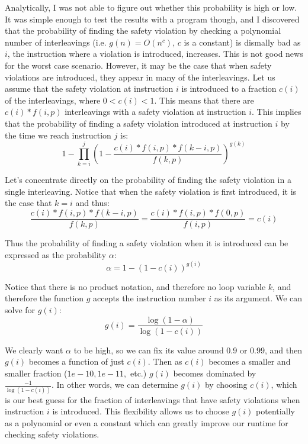 \documentclass[12pt]{article}
\begin{document}
Analytically, I was not able to figure out whether this probability is high or low.  It was simple enough to test the results with a program though, and I discovered that the probability of finding the safety violation by checking a polynomial number of interleavings (i.e. $g(n) = O(n^c)$, $c$ is a constant) is dismally bad as $i$, the instruction where a violation is introduced, increases.  This is not good news for the worst case scenario.  However, it may be the case that when safety violations are introduced, they appear in many of the interleavings.  Let us assume that the safety violation at instruction $i$ is introduced to a fraction $c(i)$ of the interleavings, where $0 < c(i) < 1$.  This means that there are $c(i)*f(i,p)$ interleavings with a safety violation at instruction $i$.  This implies that the probability of finding a safety violation introduced at instruction $i$ by the time we reach instruction $j$ is:
$$1 - \prod\limits_{k=i}^j \left(1 - \frac{c(i)*f(i,p)*f(k-i,p)}{f(k,p)}\right)^{g(k)}$$


Let's concentrate directly on the probability of finding the safety violation in a single interleaving.  Notice that when the safety violation is first introduced, it is the case that $k=i$ and thus:
$$\frac{c(i)*f(i,p)*f(k-i,p)}{f(k,p)} = \frac{c(i)*f(i,p)*f(0,p)}{f(i,p)} = c(i)$$

Thus the probability of finding a safety violation when it is introduced can be expressed as the probability $\alpha$:
$$\alpha = 1 - (1-c(i))^{g(i)}$$

Notice that there is no product notation, and therefore no loop variable $k$, and therefore the function $g$ accepts the instruction number $i$ as its argument.  We can solve for $g(i)$:
$$g(i) = \frac{\log(1-\alpha)}{\log(1-c(i))}$$

We clearly want $\alpha$ to be high, so we can fix its value around 0.9 or 0.99, and then $g(i)$ becomes a function of just $c(i)$.  Then as $c(i)$ becomes a smaller and smaller fraction ($1e-10, 1e-11,$ etc.) $g(i)$ becomes dominated by $\frac{-1}{\log(1-c(i))}$.  In other words, we can determine $g(i)$ by choosing $c(i)$, which is our best guess for the fraction of interleavings that have safety violations when instruction $i$ is introduced.  This flexibility allows us to choose $g(i)$ potentially as a polynomial or even a constant which can greatly improve our runtime for checking safety violations.  \\
\end{document}
